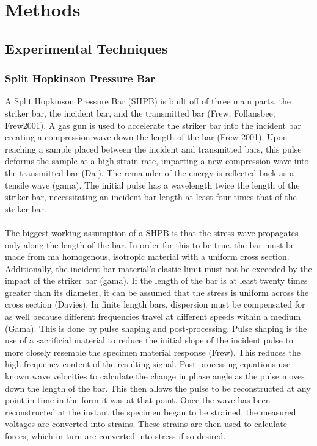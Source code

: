 \documentclass[12pt]{article}
\begin{document}
\section{Methods}

\subsection{Experimental Techniques} 

\subsubsection {Split Hopkinson Pressure Bar} %

A Split Hopkinson Pressure Bar (SHPB) is built off of three main parts, the striker bar, the incident bar, and the transmitted bar (Frew, Follansbee, Frew2001). A gas gun is used to accelerate the striker bar into the incident bar creating a compression wave down the length of the bar (Frew 2001). Upon reaching a sample placed between the incident and transmitted bars, this pulse deforms the sample at a high strain rate, imparting a new compression wave into the transmitted bar (Dai). The remainder of the energy is reflected back as a tensile wave (gama). The initial pulse has a wavelength twice the length of the striker bar, necessitating an incident bar length at least four times that of the striker bar.
\\ \\
The biggest working assumption of a SHPB is that the stress wave propagates only along the length of the bar. In order for this to be true, the bar must be made from ma homogenous, isotropic material with a uniform cross section. Additionally, the incident bar material's elastic limit must not be exceeded by the impact of the striker bar (gama). If the length of the bar is at least twenty times greater than its diameter, it can be assumed that the stress is uniform across the cross section (Davies). In finite length bars, dispersion must be compensated for as well because different frequencies travel at different speeds within a medium (Gama). This is done by pulse shaping and post-processing. Pulse shaping is the use of a sacrificial material to reduce the initial slope of the incident pulse to more closely resemble the specimen material response (Frew). This reduces the high frequency content of the resulting signal. Post processing equations use known wave velocities to calculate the change in phase angle as the pulse moves down the length of the bar. This then allows the pulse to be reconstructed at any point in time in the form it was at that point. Once the wave has been reconstructed at the instant the specimen began to be strained, the measured voltages are converted into strains. These strains are then used to calculate forces, which in turn are converted into stress if so desired. 
\end{document}
